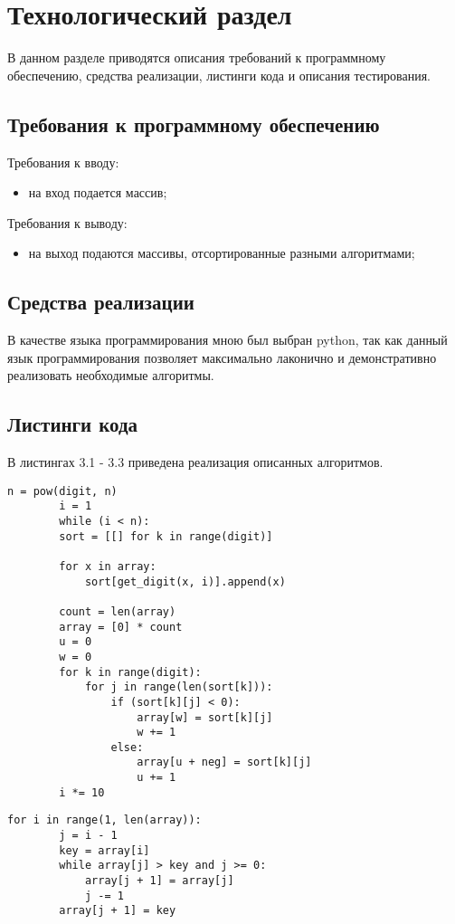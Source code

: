 \chapter{Технологический раздел}
\label{cha:impl}

В данном разделе приводятся описания требований к программному обеспечению, средства реализации, листинги кода и описания тестирования.
\section{Требования к программному обеспечению}
Требования к вводу:
\begin{itemize}
    \item на вход подается массив;
\end{itemize}
Требования к выводу:
\begin{itemize}
    \item на выход подаются массивы, отсортированные разными алгоритмами;
\end{itemize}
\section{Средства реализации}
В качестве языка программирования мною был выбран python, так как данный язык программирования позволяет максимально лаконично и демонстративно реализовать необходимые алгоритмы.
\section{Листинги кода}

В листингах 3.1 - 3.3 приведена реализация описанных алгоритмов.
\begin{lstlisting}[caption=Поразрядная сортировка]
	n = pow(digit, n)
    	i = 1
    	while (i < n):
		sort = [[] for k in range(digit)]

		for x in array:
			sort[get_digit(x, i)].append(x)

		count = len(array)
		array = [0] * count
		u = 0
		w = 0
		for k in range(digit):
			for j in range(len(sort[k])):
				if (sort[k][j] < 0):
					array[w] = sort[k][j]
					w += 1
				else:
					array[u + neg] = sort[k][j]
					u += 1
		i *= 10
\end{lstlisting}

\begin{lstlisting}[caption=Сортировка вставками]
	for i in range(1, len(array)):
		j = i - 1
		key = array[i]
		while array[j] > key and j >= 0:
			array[j + 1] = array[j]
			j -= 1
		array[j + 1] = key
\end{lstlisting}

